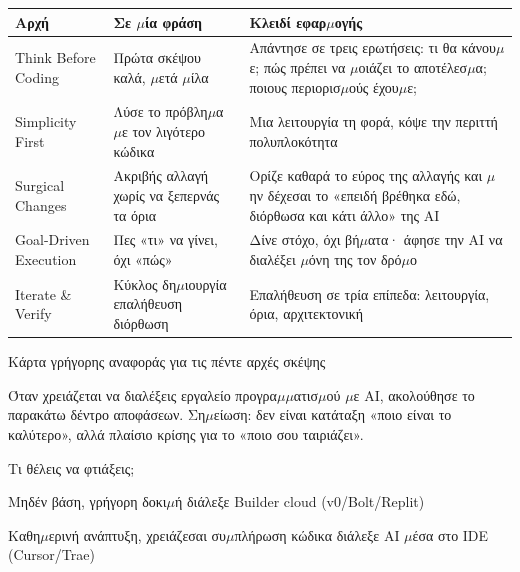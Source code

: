 


\begin{center}
\begin{tabularx}{\linewidth}{|X|X|X|}
\hline
\textbf{Αρχή} & \textbf{Σε $\mu$ία φράση} & \textbf{Κλειδί εφαρ$\mu$ογής} \tabularnewline
\hline
Think Before Coding & Πρώτα σκέψου καλά, $\mu$ετά $\mu$ίλα & Απάντησε σε τρεις ερωτήσεις: τι θα κάνου$\mu$ε; πώς πρέπει να $\mu$οιάζει το αποτέλεσ$\mu$α; ποιους περιορισ$\mu$ούς έχου$\mu$ε; \tabularnewline
Simplicity First & Λύσε το πρόβλη$\mu$α $\mu$ε τον λιγότερο κώδικα & Μια λειτουργία τη φορά, κόψε την περιττή πολυπλοκότητα \tabularnewline
Surgical Changes & Ακριβής αλλαγή χωρίς να ξεπερνάς τα όρια & Ορίζε καθαρά το εύρος της αλλαγής και $\mu$ην δέχεσαι το «επειδή βρέθηκα εδώ, διόρθωσα και κάτι άλλο» της AI \tabularnewline
Goal-Driven Execution & Πες «τι» να γίνει, όχι «πώς» & Δίνε στόχο, όχι βή$\mu$ατα· άφησε την AI να διαλέξει $\mu$όνη της τον δρό$\mu$ο \tabularnewline
Iterate \& Verify & Κύκλος δη$\mu$ιουργία επαλήθευση διόρθωση & Επαλήθευση σε τρία επίπεδα: λειτουργία, όρια, αρχιτεκτονική \tabularnewline
\hline
\end{tabularx}
\end{center}

\begin{center}\small\color{gray}Κάρτα γρήγορης αναφοράς για τις πέντε αρχές σκέψης\end{center}


Όταν χρειάζεται να διαλέξεις εργαλείο προγρα$\mu$$\mu$ατισ$\mu$ού $\mu$ε AI, ακολούθησε το παρακάτω δέντρο αποφάσεων. Ση$\mu$είωση: δεν είναι κατάταξη «ποιο είναι το καλύτερο», αλλά πλαίσιο κρίσης για το «ποιο σου ταιριάζει».

Τι θέλεις να φτιάξεις;

Μηδέν βάση, γρήγορη δοκι$\mu$ή διάλεξε Builder cloud (v0/Bolt/Replit)

Καθη$\mu$ερινή ανάπτυξη, χρειάζεσαι συ$\mu$πλήρωση κώδικα διάλεξε AI $\mu$έσα στο IDE (Cursor/Trae)

